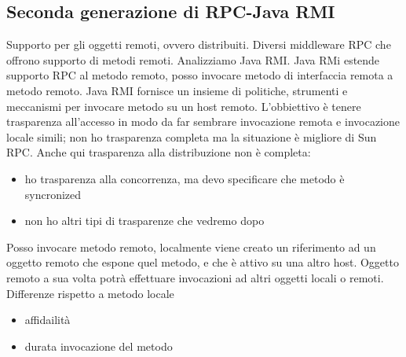 \documentclass{article}
\begin{document}
\subsection{Seconda generazione di RPC-Java RMI}
Supporto per gli oggetti remoti, ovvero distribuiti. Diversi middleware RPC che offrono supporto di metodi remoti. Analizziamo Java RMI. Java RMi estende supporto RPC al metodo remoto, posso invocare metodo di interfaccia remota a metodo remoto. Java RMI fornisce un insieme di politiche, strumenti e meccanismi per invocare metodo su un host remoto. L'obbiettivo è tenere trasparenza all'accesso in modo da far sembrare invocazione remota e invocazione locale simili; non ho trasparenza completa ma la situazione è migliore di Sun RPC. Anche qui trasparenza alla distribuzione non è completa:
\begin{itemize}
\item ho trasparenza alla concorrenza, ma devo specificare che metodo è syncronized
\item non ho altri tipi di trasparenze che vedremo dopo
\end{itemize}
Posso invocare metodo remoto, localmente viene creato un riferimento ad un oggetto remoto che espone quel metodo, e che è attivo su una altro host. Oggetto remoto a sua volta potrà effettuare invocazioni ad altri oggetti locali o remoti. Differenze rispetto a metodo locale
\begin{itemize}
\item affidailità
\item durata invocazione del metodo
\end{itemize}
\end{document}

